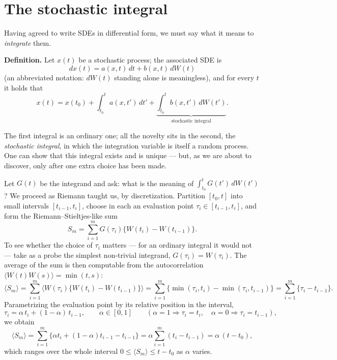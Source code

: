 \section{The stochastic integral}

Having agreed to write SDEs in differential form, we must say what it means to \emph{integrate} them.

\medskip
\noindent\textbf{Definition.}
Let $x(t)$ be a stochastic process; the associated SDE is
\begin{equation}
dx(t) = a(x,t)\,dt + b(x,t)\,dW(t)
\end{equation}
(an abbreviated notation: $dW(t)$ standing alone is meaningless), and for every $t$ it holds that
\begin{equation}
x(t) = x(t_0) + \int_{t_0}^{t} a(x,t')\,dt' + \underbrace{\int_{t_0}^{t} b(x,t')\,dW(t')}_{\text{stochastic integral}}.
\end{equation}
\medskip

The first integral is an ordinary one; all the novelty sits in the second, the \emph{stochastic integral}, in which the integration variable is itself a random process.
One can show that this integral exists and is unique --- but, as we are about to discover, only after one extra choice has been made.

Let $G(t)$ be the integrand and ask: what is the meaning of $\displaystyle\int_{t_0}^{t} G(t')\,dW(t')$?
We proceed as Riemann taught us, by discretization.
Partition $[t_0,t]$ into small intervals $[t_{i-1},t_i]$, choose in each an evaluation point $\tau_i\in[t_{i-1},t_i]$, and form the Riemann--Stieltjes-like sum
\begin{equation}
S_m = \sum_{i=1}^{m} G(\tau_i)\big\{W(t_i)-W(t_{i-1})\big\}.
\end{equation}
To see whether the choice of $\tau_i$ matters --- for an ordinary integral it would not --- take as a probe the simplest non-trivial integrand, $G(\tau_i)=W(\tau_i)$.
The average of the sum is then computable from the autocorrelation $\langle W(t)W(s)\rangle=\min(t,s)$:
\begin{equation}
\langle S_m\rangle = \sum_{i=1}^{m}\big\langle W(\tau_i)\{W(t_i)-W(t_{i-1})\}\big\rangle = \sum_{i=1}^{m}\big\{\min(\tau_i,t_i) - \min(\tau_i,t_{i-1})\big\} = \sum_{i=1}^{m}\{\tau_i - t_{i-1}\}.
\end{equation}
Parametrizing the evaluation point by its relative position in the interval,
\begin{equation}
\tau_i = \alpha\,t_i + (1-\alpha)\,t_{i-1},\qquad \alpha\in[0,1]
\qquad (\alpha=1\Rightarrow\tau_i=t_i,\quad \alpha=0\Rightarrow\tau_i=t_{i-1}),
\end{equation}
we obtain
\begin{equation}
\langle S_m\rangle = \sum_{i=1}^{m}\big\{\alpha t_i + (1-\alpha)t_{i-1} - t_{i-1}\big\} = \alpha\sum_{i=1}^{m}(t_i - t_{i-1}) = \alpha\,(t-t_0),
\end{equation}
which ranges over the whole interval $0\le\langle S_m\rangle\le t-t_0$ as $\alpha$ varies.

